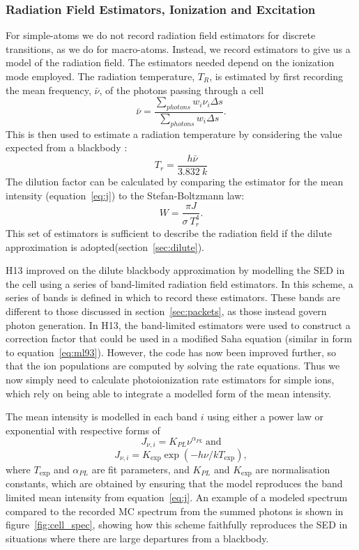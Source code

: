 \subsubsection{Radiation Field Estimators, Ionization and Excitation}
\label{sec:simple_ionization}
For simple-atoms we do not record radiation field estimators for discrete 
transitions, as we do for macro-atoms. Instead, we record estimators to
give us a model of the radiation field. The estimators needed
depend on the ionization mode employed.
The radiation temperature, $T_R$, is estimated by first recording the mean frequency, 
$\bar{\nu}$, of the photons passing through a cell
\begin{equation}
\bar{\nu} = \frac{\sum_{photons} w_i \nu_i \Delta s}{\sum_{photons} w_i \Delta s}.
\end{equation}
This is then used to estimate a radiation temperature by
considering the value expected from a blackbody \citep{ML93}:
\begin{equation}
T_r = \frac{h\bar{\nu}}{3.832~k}
\end{equation}
The dilution factor can be calculated by comparing the estimator for the mean intensity (equation~\ref{eq:j}) to the Stefan-Boltzmann law:
\begin{equation}
W = \frac{\pi J}{\sigma~T_r^4}.
\end{equation}
This set of estimators is sufficient to describe the 
radiation field if the dilute approximation is adopted(section~\ref{sec:dilute}).

H13 improved on the dilute blackbody approximation by
modelling the SED in the cell using a series of band-limited 
radiation field estimators. In this scheme, a series of bands is defined
in which to record these estimators. These bands are different to those
discussed in section~\ref{sec:packets}, as those instead govern photon generation.
In H13, the band-limited estimators were used to construct a correction factor
that could be used in a modified Saha equation 
(similar in form to equation~\ref{eq:ml93}). However, the code has now been
improved further, so that the ion populations are computed by solving the rate equations.
Thus we now simply need to calculate photoionization rate estimators for simple 
ions, which rely on being able to integrate a modelled form of the mean intensity.

The mean intensity is modelled in each band $i$ using either a power law or exponential
with respective forms of
\begin{equation}
J_{\nu,i} = K_{PL} \nu^{\alpha_{PL}}~\mathrm{and}
\end{equation}
\begin{equation}
J_{\nu,i} = K_{\exp} \exp(-h\nu / k T_{\exp}),
\end{equation}
where $T_{\exp}$ and $\alpha_{PL}$ are fit parameters, and $K_{PL}$ and $K_{\exp}$ 
are normalisation constants, which are obtained by ensuring that
the model reproduces the band limited mean intensity from equation~\ref{eq:j}.
An example of a modeled spectrum compared to the recorded MC spectrum from
the summed photons is shown in figure~\ref{fig:cell_spec}, showing how
this scheme faithfully reproduces the SED in situations where there are large departures
from a blackbody. 


